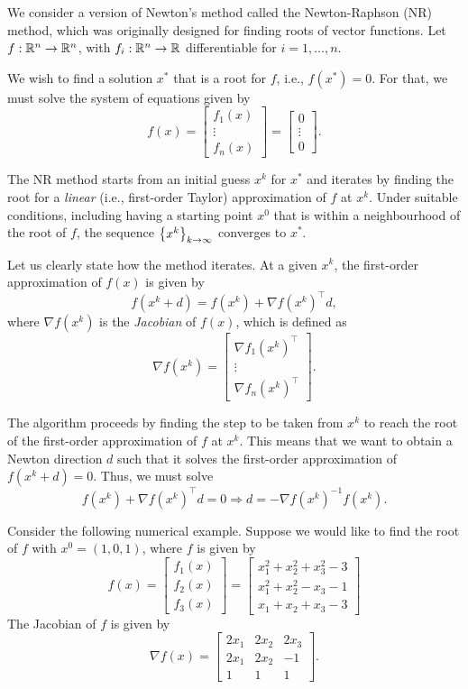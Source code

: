 We consider a version of Newton's method called the Newton-Raphson (NR) method, which was originally designed for finding roots of vector functions. Let $f: \mathbb{R}^n \to \mathbb{R}^n$, with $f_i : \mathbb{R}^n \to \mathbb{R}$ differentiable for $i = 1,\dots,n$.

We wish to find a solution $x^*$ that is a root for $f$, i.e., $f(x^*) = 0$. For that, we must solve the system of equations given by
	$$ 
	f(x) = \begin{bmatrix} f_1(x) \\ \vdots \\ f_n(x) \end{bmatrix} = \begin{bmatrix} 0 \\ \vdots \\ 0 \end{bmatrix}.
	$$
	
The NR method starts from an initial guess $x^k$ for $x^*$ and iterates by finding the root for a \emph{linear} (i.e., first-order Taylor) approximation of $f$ at $x^k$. Under suitable conditions, including having a starting point $x^0$ that is within a neighbourhood of the root of $f$, the sequence $\left\{ x^k \right \}_{k\to\infty}$ converges to $x^*$.

Let us clearly state how the method iterates. At a given $x^k$, the first-order approximation of $f(x)$ is given by
	$$ 
	f(x^k + d) = f(x^k) + \nabla f(x^k)^\top d,
	$$
	where $\nabla f(x^k)$ is the \emph{Jacobian} of $f(x)$, which is defined as
	$$ 
	\nabla f(x^k) = \begin{bmatrix} \nabla f_1(x^k)^\top \\ \vdots \\ \nabla f_n(x^k)^\top \end{bmatrix}. 
	$$
	
The algorithm proceeds by finding the step to be taken from $x^k$ to reach the root of the first-order approximation of $f$ at $x^k$. This means that we want to obtain a Newton direction $d$ such that it solves the first-order approximation of $f(x^k + d) = 0$. Thus, we must solve
	\begin{equation*}
		f(x^k) + \nabla f(x^k)^\top d = 0 \Rightarrow
		d = -\nabla f(x^k)^{-1}f(x^k).
	\end{equation*}
	
Consider the following numerical example. Suppose we would like to find the root of $f$ with $x^0 = (1,0,1)$, where $f$ is given by 
	$$
	f(x) = \begin{bmatrix}f_1(x) \\ f_2(x) \\ f_3(x) \end{bmatrix} = \begin{bmatrix} x_1^2 + x_2^2 + x_3^2 -3 \\ x_1^2 + x_2^2 - x_3 - 1 \\ x_1 + x_2 + x_3 - 3 \end{bmatrix}
	$$
	The Jacobian of $f$ is given by 
	$$
	\nabla f(x)=\begin{bmatrix} 2x_1 & 2x_2 & 2x_3 \\ 2x_1 & 2x_2 & -1 \\ 1 & 1 & 1\end{bmatrix}.
	$$
	
